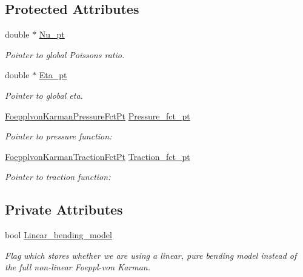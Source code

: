 \subsection*{Protected Attributes}
\begin{DoxyCompactItemize}
\item 
double $\ast$ \hyperlink{classoomph_1_1DisplacementBasedFoepplvonKarmanEquations_a4afa5c268f1fea01e6cedf4bf7e17541}{Nu\+\_\+pt}
\begin{DoxyCompactList}\small\item\em Pointer to global Poisson\textquotesingle{}s ratio. \end{DoxyCompactList}\item 
double $\ast$ \hyperlink{classoomph_1_1DisplacementBasedFoepplvonKarmanEquations_abf9d5f5d90d02be23cec55593b6f0e16}{Eta\+\_\+pt}
\begin{DoxyCompactList}\small\item\em Pointer to global eta. \end{DoxyCompactList}\item 
\hyperlink{classoomph_1_1DisplacementBasedFoepplvonKarmanEquations_a9d63b92b57e3b521a5a10cecdafc4e65}{Foepplvon\+Karman\+Pressure\+Fct\+Pt} \hyperlink{classoomph_1_1DisplacementBasedFoepplvonKarmanEquations_a6cb9ee1c546aad3a331b8eff4703613c}{Pressure\+\_\+fct\+\_\+pt}
\begin{DoxyCompactList}\small\item\em Pointer to pressure function\+: \end{DoxyCompactList}\item 
\hyperlink{classoomph_1_1DisplacementBasedFoepplvonKarmanEquations_ab2c41b3ecc15b89802657c068ee3e1cc}{Foepplvon\+Karman\+Traction\+Fct\+Pt} \hyperlink{classoomph_1_1DisplacementBasedFoepplvonKarmanEquations_ae89a72c87d03fe0fceee1a42bcd3fcb8}{Traction\+\_\+fct\+\_\+pt}
\begin{DoxyCompactList}\small\item\em Pointer to traction function\+: \end{DoxyCompactList}\end{DoxyCompactItemize}
\subsection*{Private Attributes}
\begin{DoxyCompactItemize}
\item 
bool \hyperlink{classoomph_1_1DisplacementBasedFoepplvonKarmanEquations_a1773ca38afe50787584bc7d00993447b}{Linear\+\_\+bending\+\_\+model}
\begin{DoxyCompactList}\small\item\em Flag which stores whether we are using a linear, pure bending model instead of the full non-\/linear Foeppl-\/von Karman. \end{DoxyCompactList}\end{DoxyCompactItemize}
